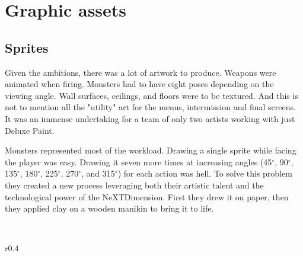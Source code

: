 \section{Graphic assets}
\subsection{Sprites}
Given the ambitions, there was a lot of artwork to produce. Weapons were animated when firing. Monsters had to have eight poses depending on the viewing angle. Wall surfaces, ceilings, and floors were to be textured. And this is not to mention all the "utility" art for the menus, intermission and final screens. It was an immense undertaking for a team of only two artists working with just Deluxe Paint.\\
\par
Monsters represented most of the workload. Drawing a single sprite while facing the player was easy. Drawing it seven more times at increasing angles (45$^{\circ}$, 90$^{\circ}$, 135$^{\circ}$, 180$^{\circ}$, 225$^{\circ}$, 270$^{\circ}$, and 315$^{\circ}$) for each action was hell. To solve this problem they created a new process leveraging both their artistic talent and the technological power of the NeXTDimension. First they drew it on paper, then they applied clay on a wooden manikin to bring it to life.\\
\par


\\


\begin{wrapfigure}[8]{r}{0.4\textwidth}
\centering
{}
\end{wrapfigure}

